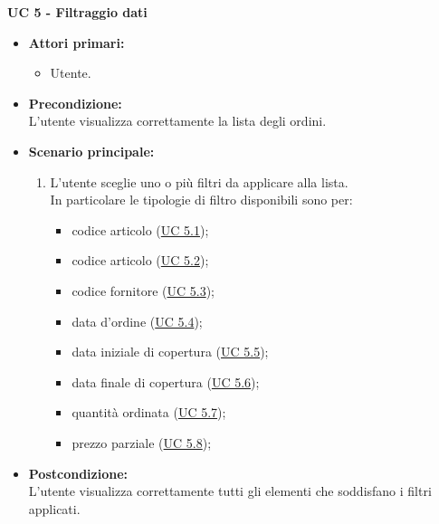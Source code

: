 \noindent \textbf{\large UC 5 - Filtraggio dati}
\label{uc:filtraggio-dati}
\begin{itemize}

	\item \textbf{Attori primari: }
		\begin{itemize}
			\item Utente.
		\end{itemize}

	\item \textbf{Precondizione: }\\[0.3cm]
		L'utente visualizza correttamente la lista degli ordini.

	\item \textbf{Scenario principale: }
		\begin{enumerate}
			\item L'utente sceglie uno o più filtri da applicare alla lista.\\
			In particolare le tipologie di filtro disponibili sono per:
			\begin{itemize}
				\item codice articolo (\hyperref[uc:filtraggio-codice-articolo]{UC 5.1});
				\item codice articolo (\hyperref[uc:filtraggio-codice-articolo]{UC 5.2});
				\item codice fornitore (\hyperref[uc:filtraggio-codice-fornitore]{UC 5.3});
				\item data d'ordine (\hyperref[uc:filtraggio-data-ordine]{UC 5.4});
				\item data iniziale di copertura (\hyperref[uc:filtraggio-data-iniziale-copertura]{UC 5.5});
				\item data finale di copertura (\hyperref[uc:filtraggio-data-finale-copertura]{UC 5.6});
				\item quantità ordinata (\hyperref[uc:filtraggio-quantita-ordinata]{UC 5.7});
				\item prezzo parziale (\hyperref[uc:filtraggio-prezzo-parziale-ord]{UC 5.8});
			\end{itemize}
		\end{enumerate}
		

	\item \textbf{Postcondizione: }\\[0.3cm]
		L'utente visualizza correttamente tutti gli elementi che soddisfano i filtri applicati.

\end{itemize}

\vspace{0.5cm}

